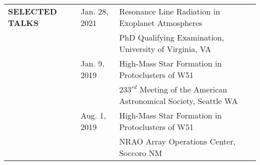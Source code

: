 \documentclass{article}
\begin{document}
\begin{tabular}{p{4cm}p{2.2cm}l}
    \large{\textbf{SELECTED \newline TALKS}}
    &Jan. 28, 2021 & Resonance Line Radiation in Exoplanet Atmospheres \vspace{-0.45cm}\\
    &              & \small PhD Qualifying Examination, University of Virginia, VA  \vspace{0.125cm} \\
    &Jan. 9, 2019 & High-Mass Star Formation in Protoclusters of W51 \\
    &            & \small $233^{rd}$ Meeting of the American Astronomical Society, Seattle WA  \vspace{0.125cm} \\
    &Aug. 1, 2019 & High-Mass Star Formation in Protoclusters of W51 \\
    &             & \small NRAO Array Operations Center, Soccoro NM  \vspace{0.125cm} \\
\end{tabular}
\vspace{0.5cm}



\end{document}
